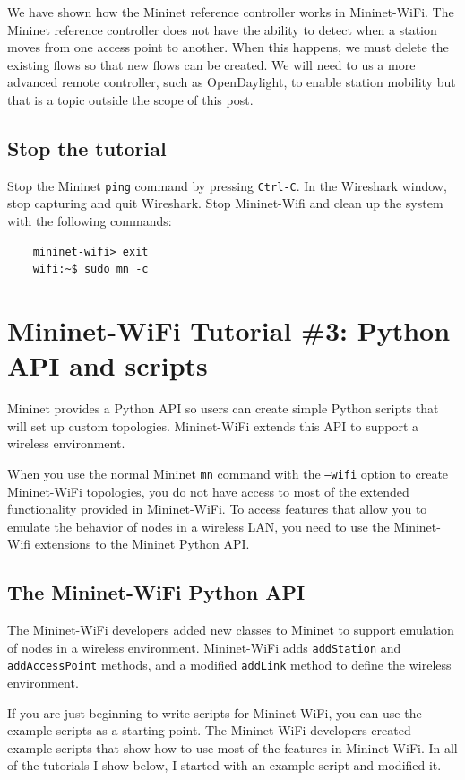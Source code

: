 We have shown how the Mininet reference controller works in Mininet-WiFi. The Mininet reference controller does not have the ability to detect when a station moves from one access point to another. When this happens, we must delete the existing flows so that new flows can be created. We will need to us a more advanced remote controller, such as OpenDaylight, to enable station mobility but that is a topic outside the scope of this post.

\subsection{Stop the tutorial}

Stop the Mininet \texttt{ping} command by pressing \texttt{Ctrl-C}. In the Wireshark window, stop capturing and quit Wireshark. Stop Mininet-Wifi and clean up the system with the following commands:

\begin{verbatim}
    mininet-wifi> exit
    wifi:~$ sudo mn -c
\end{verbatim}

\section{Mininet-WiFi Tutorial \#3: Python API and scripts}

Mininet provides a Python API so users can create simple Python scripts that will set up custom topologies. Mininet-WiFi extends this API to support a wireless environment.

When you use the normal Mininet \texttt{mn} command with the \texttt{--wifi} option to create Mininet-WiFi topologies, you do not have access to most of the extended functionality provided in Mininet-WiFi. To access features that allow you to emulate the behavior of nodes in a wireless LAN, you need to use the Mininet-Wifi extensions to the Mininet Python API.

\subsection{The Mininet-WiFi Python API}

The Mininet-WiFi developers added new classes to Mininet to support emulation of nodes in a wireless environment. Mininet-WiFi adds \texttt{addStation} and \texttt{addAccessPoint} methods, and a modified \texttt{addLink} method to define the wireless environment. 

If you are just beginning to write scripts for Mininet-WiFi, you can use the example scripts as a starting point. The Mininet-WiFi developers created example scripts that show how to use most of the features in Mininet-WiFi. In all of the tutorials I show below, I started with an example script and modified it. 

